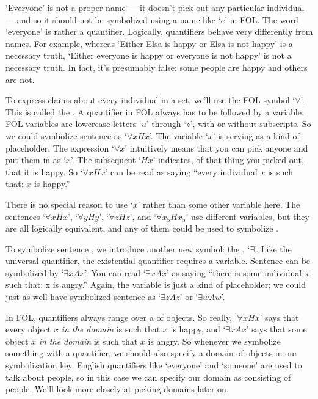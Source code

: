 `Everyone' is not a proper name --- it doesn't pick out any particular individual --- and so it should not be symbolized using a name like `$e$' in FOL.  The word `everyone' is rather a quantifier.  Logically, quantifiers behave very differently from names.  For example, whereas `Either Elsa is happy or Elsa is not happy' is a necessary truth, `Either everyone is happy or everyone is not happy' is not a necessary truth.  In fact, it's presumably false: some people are happy and others are not.

To express claims about every individual in a set, we'll use the FOL symbol `$\forall$'.  This is called the .  A quantifier in FOL always has to be followed by a variable. FOL variables are lowercase letters `$u$' through `$z$', with or without subscripts. So we could symbolize sentence  as `$\forall x Hx$'.  The variable `$x$' is serving as a kind of placeholder. The expression `$\forall x$' intuitively means that you can pick anyone and put them in as `$x$'. The subsequent `$Hx$' indicates, of that thing you picked out, that it is happy.  So `$\forall x Hx$' can be read as saying ``every individual $x$ is such that: $x$ is happy.''

There is no special reason to use `$x$' rather than some other variable here. The sentences `$\forall x Hx$', `$\forall y Hy$', `$\forall z Hz$', and `$\forall x_5 Hx_5$' use different variables, but they are all logically equivalent, and any of them could be used to symbolize .

To symbolize sentence , we introduce another new symbol: the , `$\exists$'. Like the universal quantifier, the existential quantifier requires a variable. Sentence  can be symbolized by `$\exists x Ax$'. You can read `$\exists x Ax$' as saying ``there is some individual x such that: x is angry.'' Again, the variable is just a kind of placeholder; we could just as well have symbolized sentence  as `$\exists z Az$' or `$\exists w Aw$'.

In FOL, quantifiers always range over a  of objects.  So really, `$\forall xHx$' says that every object $x$ \emph{in the domain} is such that $x$ is happy, and `$\exists xAx$' says that some object $x$ \emph{in the domain} is such that $x$ is angry.  So whenever we symbolize something with a quantifier, we should also specify a domain of objects in our symbolization key.  English quantifiers like `everyone' and `someone' are used to talk about people, so in this case we can specify our domain as consisting of people.  We'll look more closely at picking domains later on.



